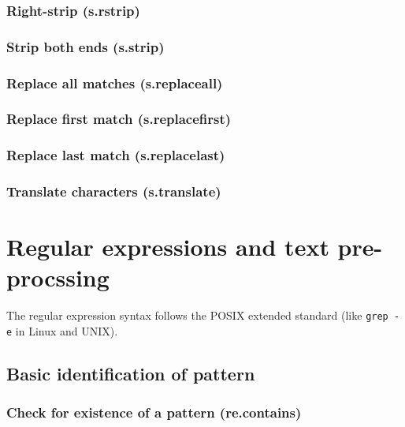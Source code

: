 \documentclass{article}
\theoremstyle{definition}
\begin{document}
\subsubsection{Right-strip (s.rstrip)}

\subsubsection{Strip both ends (s.strip)}

\subsubsection{Replace all matches (s.replaceall)}

\subsubsection{Replace first match (s.replacefirst)}

\subsubsection{Replace last match (s.replacelast)}

\subsubsection{Translate characters (s.translate)}

\pagebreak

\section{Regular expressions and text pre-procssing}

The regular expression syntax follows the POSIX extended standard (like {\tt grep -e} in Linux and UNIX).

\subsection{Basic identification of pattern}

\subsubsection{Check for existence of a pattern (re.contains)}
\end{document}
